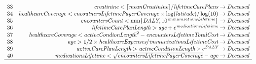 \documentclass[ijds,nonblindrev]{informs-ijds}
\begin{document}
\begin{APPENDICES}
\begin{table}[!ht]
{\[\begin{array}{lr}
33 & \textit{creatinine} < \lceil \textit{meanCreatinine} \rceil/\textit{lifetimeCarePlans} \rightarrow \textit{Deceased} \\
34 & \textit{healthcareCoverage} < \textit{encoutnersLifetimePayerCoverage}\times \log (\textit{latitude})/\log (10)  \rightarrow \textit{Deceased} \\
35 & \textit{encountersCount} < \min \{ \textit{DALY}, 10^\textit{immunizationsLifetime}\}  \rightarrow \textit{Deceased} \\
36 & \textit{lifetimeCarePlanLength} > \textit{age} +  e^{\textit{medicationsLifetime}} \rightarrow \textit{Deceased} \\
37 & \textit{healthcareCoverage} < \textit{activeCondionLength}^2- \textit{encountersLifetimeTotalCost} \rightarrow \textit{Deceased} \\
38 & \textit{age} > 1/2 \times \textit{healthcareExpenses}/\textit{immunizationsLifetimeCost} \rightarrow \textit{Deceased} \\
39 & \textit{activeCarePlanLength} > \textit{activeConditionLength}\times e^{\textit{DALY}} \rightarrow \textit{Deceased} \\
40 & \textit{medicationsLifetime} < \sqrt{\textit{encountersLifetimePayerCoverage}} - \textit{age} \rightarrow \textit{Deceased} \\ \hline
\end{array} 
\]
}
\end{table}
\newpage


\end{APPENDICES}
\end{document}
